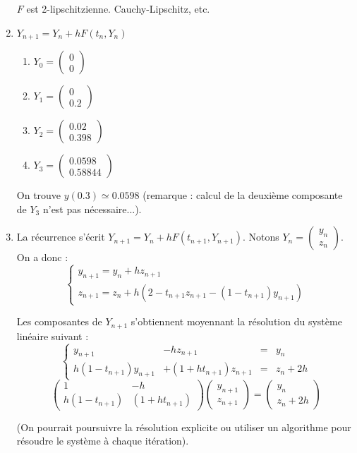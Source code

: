 \documentclass[a4paper]{article}
\begin{document}
\begin{enumerate}
$F$ est 2-lipschitzienne. Cauchy-Lipschitz, etc.
\item $Y_{n+1} = Y_n + hF(t_n, Y_n)$
\begin{enumerate}
\item $Y_0=\left(\begin{array}{c}0\\0\end{array}\right)$
\item $Y_1=\left(\begin{array}{c}0\\0.2\end{array}\right)$
\item $Y_2=\left(\begin{array}{c}0.02\\0.398 \end{array}\right)$
\item $Y_3=\left(\begin{array}{c}0.0598\\0.58844\end{array}\right)$
\end{enumerate}
On trouve $y(0.3)\simeq 0.0598$ (remarque : calcul de la deuxième composante de $Y_3$ n'est
pas nécessaire...).
\item La récurrence s'écrit $Y_{n+1} = Y_n + hF(t_{n+1}, Y_{n+1})$. Notons $Y_n =\left(\begin{array}{c} y_n\\z_n\end{array}\right)$.
On a donc :
\[\left\{\begin{array}{l}
y_{n+1} = y_n + hz_{n+1}\\
z_{n+1} = z_n + h(2-t_{n+1}z_{n+1} - (1 - t_{n+1})y_{n+1})
\end{array}\right.\]

Les composantes de $Y_{n+1}$ s'obtiennent moyennant la résolution du système linéaire suivant
:
\[\left\{\begin{array}{rrcl}
y_{n+1} & -hz_{n+1} &= &y_n \\
h(1 - t_{n+1})y_{n+1} & +(1+ht_{n+1})z_{n+1} &=&z_n+2h
\end{array}\right.\]
\[\left(\begin{array}{cc}
1& -h \\
h(1 - t_{n+1})& (1+ht_{n+1})
\end{array}\right)  \left(\begin{array}{c} y_{n+1}\\z_{n+1}\end{array}\right)=\left(\begin{array}{c} y_n\\z_n+2h\end{array}\right)\]

(On pourrait poursuivre la résolution explicite ou utiliser un algorithme pour résoudre le système à chaque itération).
\end{enumerate}
\end{document}
